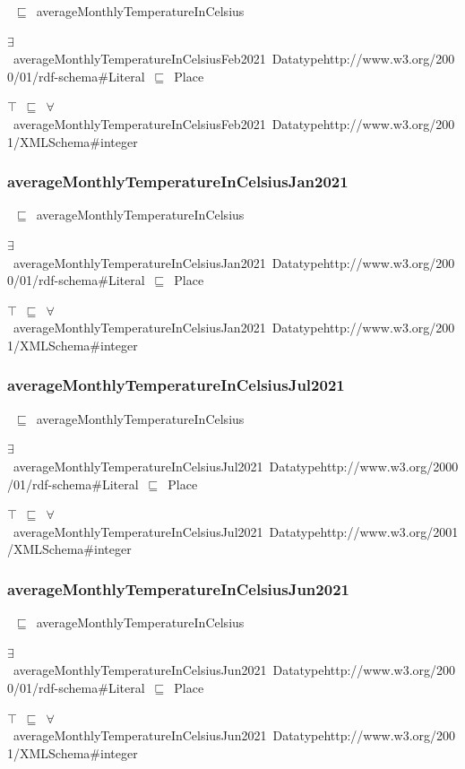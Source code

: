 \documentclass{article}
\begin{document}
~\ensuremath{\sqsubseteq}~averageMonthlyTemperatureInCelsius

\ensuremath{\exists}~averageMonthlyTemperatureInCelsiusFeb2021~Datatypehttp://www.w3.org/2000/01/rdf-schema#Literal~\ensuremath{\sqsubseteq}~Place

\ensuremath{\top}~\ensuremath{\sqsubseteq}~\ensuremath{\forall}~averageMonthlyTemperatureInCelsiusFeb2021~Datatypehttp://www.w3.org/2001/XMLSchema#integer

\subsubsection*{averageMonthlyTemperatureInCelsiusJan2021}

~\ensuremath{\sqsubseteq}~averageMonthlyTemperatureInCelsius

\ensuremath{\exists}~averageMonthlyTemperatureInCelsiusJan2021~Datatypehttp://www.w3.org/2000/01/rdf-schema#Literal~\ensuremath{\sqsubseteq}~Place

\ensuremath{\top}~\ensuremath{\sqsubseteq}~\ensuremath{\forall}~averageMonthlyTemperatureInCelsiusJan2021~Datatypehttp://www.w3.org/2001/XMLSchema#integer

\subsubsection*{averageMonthlyTemperatureInCelsiusJul2021}

~\ensuremath{\sqsubseteq}~averageMonthlyTemperatureInCelsius

\ensuremath{\exists}~averageMonthlyTemperatureInCelsiusJul2021~Datatypehttp://www.w3.org/2000/01/rdf-schema#Literal~\ensuremath{\sqsubseteq}~Place

\ensuremath{\top}~\ensuremath{\sqsubseteq}~\ensuremath{\forall}~averageMonthlyTemperatureInCelsiusJul2021~Datatypehttp://www.w3.org/2001/XMLSchema#integer

\subsubsection*{averageMonthlyTemperatureInCelsiusJun2021}

~\ensuremath{\sqsubseteq}~averageMonthlyTemperatureInCelsius

\ensuremath{\exists}~averageMonthlyTemperatureInCelsiusJun2021~Datatypehttp://www.w3.org/2000/01/rdf-schema#Literal~\ensuremath{\sqsubseteq}~Place

\ensuremath{\top}~\ensuremath{\sqsubseteq}~\ensuremath{\forall}~averageMonthlyTemperatureInCelsiusJun2021~Datatypehttp://www.w3.org/2001/XMLSchema#integer
\end{document}
